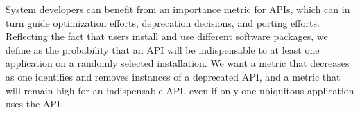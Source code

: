 \begin{comment}
Knowing the values of system interfaces among users is the prerequisite of evaluating platform compatibility.
When OS developers test their systems, a common approach is to prepare numerous test cases that exercise individual system interfaces.
It is often a natural thing to do for OS developers to maintain a list of supported system interfaces,
for either development purpose or advertisement.
However, because system interfaces have different values for users, they cannot be equal while evaluating platform compatibility of the OS.
A frequently used system interface should be considered more important for compatibility than a rarely used one.
\end{comment}

\papersubsection{\Usagemetric{}}

System developers can benefit from an importance metric for APIs,
which can in turn guide optimization efforts, deprecation decisions,
and porting efforts.  
Reflecting the fact that users install and use different software packages,
we define
\usagemetric{} as the probability that
an API will be indispensable to 
 at least one application on a randomly selected 
installation.
We want a metric that decreases
as one identifies and removes instances
of a deprecated API,
and a metric that will remain high for an indispensable API, 
even if only one ubiquitous application uses the API.






